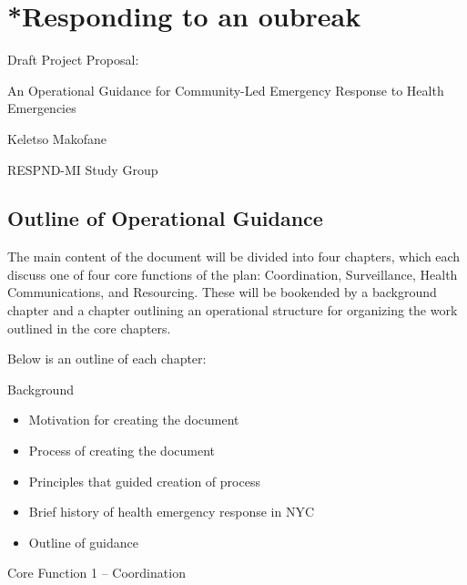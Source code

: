 \documentclass[
  letterpaper,
  DIV=11,
  numbers=noendperiod,
  oneside]{scrreprt}
\begin{document}
\hypertarget{responding-to-an-oubreak}{%
\chapter{*Responding to an oubreak}\label{responding-to-an-oubreak}}

Draft Project Proposal:

An Operational Guidance for Community-Led Emergency Response to Health
Emergencies

Keletso Makofane

RESPND-MI Study Group

\hypertarget{outline-of-operational-guidance}{%
\section{Outline of Operational
Guidance}\label{outline-of-operational-guidance}}

\hfill\break

The main content of the document will be divided into four chapters,
which each discuss one of four core functions of the plan: Coordination,
Surveillance, Health Communications, and Resourcing. These will be
bookended by a background chapter and a chapter outlining an operational
structure for organizing the work outlined in the core chapters.~

\hfill\break

Below is an outline of each chapter:~

\hfill\break

Background

\begin{itemize}
\item
  Motivation for creating the document
\item
  Process of creating the document
\item
  Principles that guided creation of process
\item
  Brief history of health emergency response in NYC
\item
  Outline of guidance
\end{itemize}

\hfill\break

Core Function 1 -- Coordination~
\end{document}
